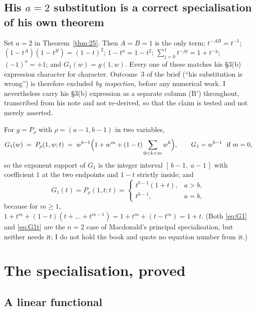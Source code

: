 \documentclass[11pt]{article}
\theoremstyle{definition}
\begin{document}
\subsection{His \texorpdfstring{$a=2$}{a=2} substitution is a correct specialisation of his own
theorem}\label{sec:spec}

Set $a=2$ in Theorem~\ref{thm:25}. Then $A=B=1$ is the only term; $t^{-AB}=t^{-1}$;
$(1-t^A)(1-t^B)=(1-t)^2$; $1-t^a=1-t^2$; $\sum_{j=0}^{1}t^{-jy}=1+t^{-y}$; $(-1)^a=+1$; and
$G_1(w)=g(1,w)$. Every one of these matches his \S3(b) expression character for character.
Outcome~3 of the brief (``his substitution is wrong'') is therefore excluded \emph{by inspection},
before any numerical work. I nevertheless carry his \S3(b) expression as a separate column
($\mathrm{B}'$) throughout, transcribed from his note and not re-derived, so that the claim is
tested and not merely asserted.

For $g=P_\rho$ with $\rho=(a-1,b-1)$ in two variables,
\begin{equation}\label{eq:G1}
  G_1(w)\;=\;P_\rho(1,w;t)\;=\;w^{b-1}\Bigl(1+w^{m}+(1-t)\sum_{0<k<m}w^k\Bigr),
  \qquad G_1=w^{b-1}\ \text{ if } m=0,
\end{equation}
so the exponent support of $G_1$ is the integer interval $[\,b-1,\;a-1\,]$ with coefficient $1$ at
the two endpoints and $1-t$ strictly inside; and
\begin{equation}\label{eq:G1t}
  G_1(t)=P_\rho(1,t;t)=\begin{cases} t^{b-1}(1+t), & a>b,\\ t^{b-1}, & a=b,\end{cases}
\end{equation}
because for $m\ge1$, $1+t^m+(1-t)(t+\dots+t^{m-1})=1+t^m+(t-t^m)=1+t$. (Both \eqref{eq:G1} and
\eqref{eq:G1t} are the $n=2$ case of Macdonald's principal specialisation, but neither needs it;
I do not hold the book and quote no equation number from it.)

\section{The specialisation, proved}\label{sec:proof}

\subsection{A linear functional}
\end{document}
